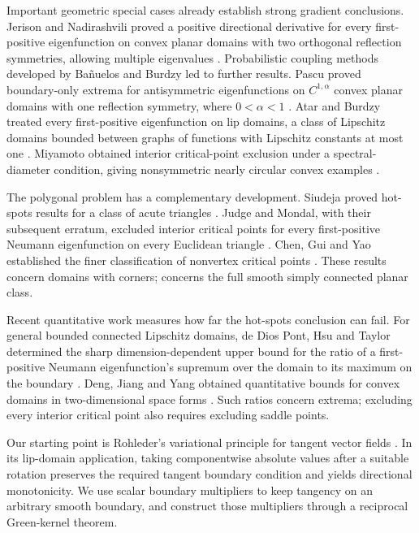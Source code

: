 Important geometric special cases already establish strong gradient conclusions. Jerison and Nadirashvili proved a positive directional derivative for every first-positive eigenfunction on convex planar domains with two orthogonal reflection symmetries, allowing multiple eigenvalues \cite[Theorem~1.4]{JerisonNadirashvili2000}. Probabilistic coupling methods developed by Bañuelos and Burdzy \cite{BanuelosBurdzy1999} led to further results. Pascu proved boundary-only extrema for antisymmetric eigenfunctions on $C^{1,\alpha}$ convex planar domains with one reflection symmetry, where $0<\alpha<1$ \cite{Pascu2002}. Atar and Burdzy treated every first-positive eigenfunction on lip domains, a class of Lipschitz domains bounded between graphs of functions with Lipschitz constants at most one \cite{AtarBurdzy2004}. Miyamoto obtained interior critical-point exclusion under a spectral-diameter condition, giving nonsymmetric nearly circular convex examples \cite[Lemma~1.2 and Theorem~A]{Miyamoto2007}.

The polygonal problem has a complementary development. Siudeja proved hot-spots results for a class of acute triangles \cite{Siudeja2015}. Judge and Mondal, with their subsequent erratum, excluded interior critical points for every first-positive Neumann eigenfunction on every Euclidean triangle \cite{JudgeMondal2020,JudgeMondal2022}. Chen, Gui and Yao established the finer classification of nonvertex critical points \cite{ChenGuiYao2026}. These results concern domains with corners;  concerns the full smooth simply connected planar class.

Recent quantitative work measures how far the hot-spots conclusion can fail. For general bounded connected Lipschitz domains, de Dios Pont, Hsu and Taylor determined the sharp dimension-dependent upper bound for the ratio of a first-positive Neumann eigenfunction's supremum over the domain to its maximum on the boundary \cite[Definition~1 and Theorem~4]{deDiosPontHsuTaylor2025}. Deng, Jiang and Yang obtained quantitative bounds for convex domains in two-dimensional space forms \cite{DengJiangYang2026}. Such ratios concern extrema; excluding every interior critical point also requires excluding saddle points.

Our starting point is Rohleder's variational principle for tangent vector fields \cite{Rohleder2021,Rohleder2024}. In its lip-domain application, taking componentwise absolute values after a suitable rotation preserves the required tangent boundary condition and yields directional monotonicity. We use scalar boundary multipliers to keep tangency on an arbitrary smooth boundary, and construct those multipliers through a reciprocal Green-kernel theorem.


